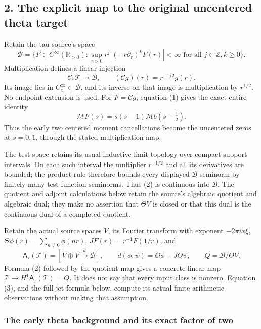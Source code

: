 \subsection{2. The explicit map to the original uncentered theta
target}\label{the-explicit-map-to-the-original-uncentered-theta-target}

Retain the tau source's space \[
\mathscr B=\{F\in C^\infty(\mathbb R_{>0}):\sup_{r>0}r^j|(-r\partial_r)^kF(r)|<\infty\text{ for all }j\in\mathbb Z,k\ge0\}.
\] Multiplication defines a linear injection \[
\mathcal C:\mathscr T\longrightarrow\mathscr B,\qquad (\mathcal Cg)(r)=r^{-1/2}g(r).
\tag{2}
\] Its image lies in \(C_c^\infty\subset\mathscr B\), and its inverse on
that image is multiplication by \(r^{1/2}\). No endpoint extension is
used. For \(F=\mathcal Cg\), equation (1) gives the exact entire
identity \[
\boxed{\mathcal MF(s)=s(s-1)\mathcal Mb(s-\tfrac12).}
\tag{3}
\] Thus the early two centered moment cancellations become the
uncentered zeros at \(s=0,1\), through the stated multiplication map.

The test space retains its usual inductive-limit topology over compact
support intervals. On each such interval the multiplier \(r^{-1/2}\) and
all its derivatives are bounded; the product rule therefore bounds every
displayed \(\mathscr B\) seminorm by finitely many test-function
seminorms. Thus (2) is continuous into \(\mathscr B\). The quotient and
adjoint calculations below retain the source's algebraic quotient and
algebraic dual; they make no assertion that \(\Theta V\) is closed or
that this dual is the continuous dual of a completed quotient.

Retain the actual source spaces \(V\), its Fourier transform with
exponent \(-2\pi i x\xi\), \(\Theta\phi(r)=\sum_{n\ne0}\phi(nr)\),
\(JF(r)=r^{-1}F(1/r)\), and \[
\mathsf A_\tau(\mathcal T)=[V\oplus V\xrightarrow{d}\mathscr B],\qquad
d(\phi,\psi)=\Theta\phi-J\Theta\psi,
\qquad Q=\mathscr B/\Theta V.
\] Formula (2) followed by the quotient map gives a concrete linear map
\(\mathscr T\to H^1\mathsf A_\tau(\mathcal T)=Q\). It does not say that
every input class is nonzero. Equation (3), and the full jet formula
below, compute its actual finite arithmetic observations without making
that assumption.

\subsubsection{The early theta background and its exact factor of
two}\label{the-early-theta-background-and-its-exact-factor-of-two}

